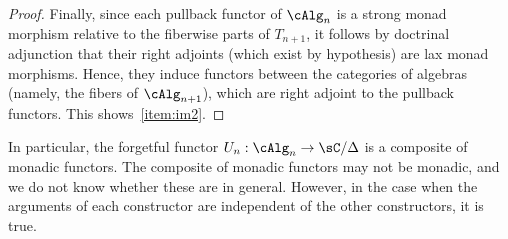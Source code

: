 \documentclass{amsart}
\begin{document}
\begin{proof}
  Finally, since each pullback functor of $\cAlg_n$ is a strong monad morphism relative to the fiberwise parts of $T_{n+1}$, it follows by doctrinal adjunction that their right adjoints (which exist by hypothesis) are lax monad morphisms.
  Hence, they induce functors between the categories of algebras (namely, the fibers of $\cAlg_{n+1}$), which are right adjoint to the pullback functors.
  This shows~\ref{item:im2}.
\end{proof}


In particular, the forgetful functor $U_n:\cAlg_n \to \sC/\Delta$ is a composite of monadic functors.
The composite of monadic functors may not be monadic, and we do not know whether these are in general.
However, in the case when the arguments of each constructor are independent of the other constructors, it is true.
\end{document}

